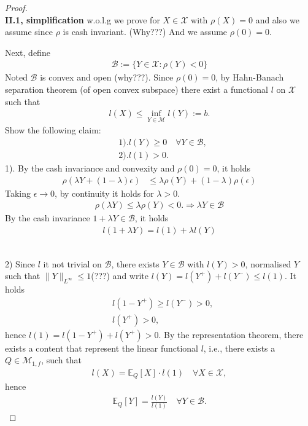 \documentclass[a4paper,11pt]{book}
\theoremstyle{definition}
\theoremstyle{remark}
\begin{document}
\begin{proof}
\quad\\
\textbf{II.1, simplification} w.o.l.g we prove for $X \in \mathcal{X}$ with $\rho(X) = 0$ and also we assume since $\rho$ is cash invariant. (Why???) And we assume $\rho(0) = 0$. \par 
\quad\par 
Next, define 
\begin{align*}
	\mathcal{B}:= \{ Y \in \mathcal{X}: \rho(Y) < 0\}
\end{align*}
Noted $\mathcal{B}$ is convex and open (why???). Since $\rho(0) = 0$, by Hahn-Banach separation theorem (of open convex subspace) there exist a functional $l$ on $\mathcal{X}$ such that
\begin{align*}
	l(X) \le \inf_{Y \in \mathcal{M}} l(Y):= b. 
\end{align*}
Show the following claim:
\begin{align*}
	& 1). l(Y) \ge 0 \quad \forall Y \in \mathcal{B},\\
	& 2). l(1) > 0. 
\end{align*}
1). By the cash invariance and convexity and $\rho(0) = 0$, it holds
\begin{align*}
	\rho(\lambda Y + (1 - \lambda) \epsilon) & \le \lambda \rho (Y) + ( 1 - \lambda ) \rho(\epsilon) 
\end{align*}
Taking $\epsilon \rightarrow 0$, by continuity it holds for $\lambda > 0$. 
\begin{align*}
	\rho (\lambda Y) \le \lambda \rho(Y) < 0. \Rightarrow \lambda Y \in \mathcal{B}
\end{align*}
By the cash invariance $ 1 + \lambda Y \in \mathcal{B}$, it holds
\begin{align*}
	l( 1 + \lambda Y) = l(1) + \lambda l(Y)
\end{align*}


\quad\\
2) Since $l$ it not trivial on $\mathcal{B}$, there exists $Y \in \mathcal{B}$ with $l(Y) > 0$, normalised $Y$ such that $\|Y\|_{L^\infty} \le 1$(???) and write $l(Y) = l(Y^+) + l(Y^-) \le l(1) $. It holds
\begin{align*}
	& l(1 - Y^+) \ge l(Y^-) > 0, \\
	& l(Y^+) > 0,	
\end{align*}
hence $l(1) = l(1 - Y^+) + l(Y^+) > 0$. By the representation theorem, there exists a content that represent the linear functional $l$, i.e., there exists a $Q \in \mathcal{M}_{1, f}$, such that
\begin{align*}
	l(X) = \mathbb{E}_Q[X] \cdot l(1) \quad \forall X \in \mathcal{X}, 
\end{align*} 
hence
\begin{align*}
	\mathbb{E}_Q  [Y] = \frac{l(Y)}{l(1)} \quad \forall Y \in \mathcal{B}. 
\end{align*}
\end{proof}
\end{document}
